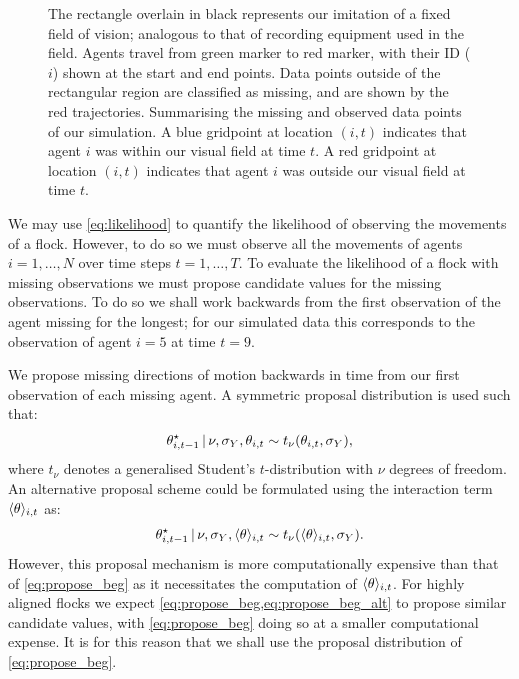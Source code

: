 \begin{figure}[tbp]
{    The rectangle overlain in black represents our imitation of a fixed
    field of vision; analogous to that of recording equipment used in the
    field. Agents travel from green marker to red marker, with their ID ($i$)
    shown at the start and end points. Data points outside of the rectangular
    region are classified as missing, and are shown by the red trajectories.
     Summarising the missing and observed data
    points of our simulation. A blue gridpoint at location $(i, t)$ indicates
    that agent $i$ was within our visual field at time $t$. A red gridpoint at
    location $(i, t)$ indicates that agent $i$ was outside our visual field
    at time $t$.}
  \label{fig:beg_data}
\end{figure}

We may use \cref{eq:likelihood} to quantify the likelihood of observing the
movements of a flock. However, to do so we must observe all the movements of
agents $i=1,\ldots,N$ over time steps $t=1,\ldots,T$. To evaluate the
likelihood of a flock with missing observations we must propose candidate
values for the missing observations. To do so we shall work backwards from the
first observation of the agent missing for the longest; for our simulated data
this corresponds to the observation of agent $i=5$ at time $t=9$.

We propose missing directions of motion backwards in time from our first
observation of each missing agent. A symmetric proposal
distribution is used such that:
\begin{equation}
  \label{eq:propose_beg}
  \theta_{i,t-1}^{\star} \,|\, \nu, \sigma_Y, \theta_{i,t}
    \sim t_{\nu}(\theta_{i,t}, \sigma_Y),
\end{equation}
where $t_{\nu}$ denotes a generalised Student's $t$-distribution with $\nu$
degrees of freedom. An alternative proposal scheme could be formulated using
the interaction term $\langle\theta\rangle_{i,t}$ as:
\begin{equation}
  \label{eq:propose_beg_alt}
  \theta_{i,t-1}^{\star} \,|\, \nu, \sigma_Y, \langle\theta\rangle_{i,t}
    \sim t_{\nu}(\langle\theta\rangle_{i,t}, \sigma_Y).
\end{equation}
However, this proposal mechanism is more computationally expensive than that of
\cref{eq:propose_beg} as it necessitates the computation of
$\langle\theta\rangle_{i,t}$. For highly aligned flocks we expect
\cref{eq:propose_beg,eq:propose_beg_alt} to propose similar candidate values,
with \cref{eq:propose_beg} doing so at a smaller computational expense. It is
for this reason that we shall use the proposal distribution of
\cref{eq:propose_beg}.

